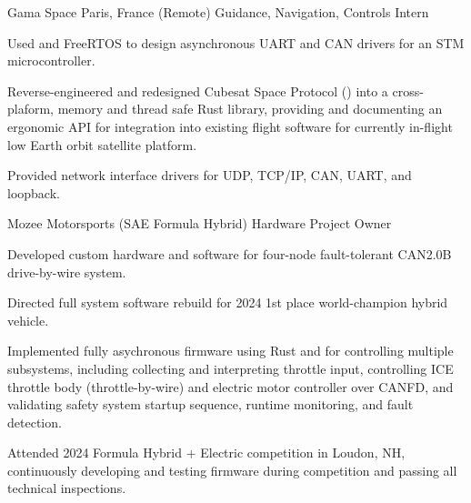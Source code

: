 \documentclass[11pt]{article}
\begin{document}
\sectionloc
{Gama Space} {Paris, France (Remote)}
{Guidance, Navigation, Controls Intern} {}
{\begin{circlist}
  \item Used  and FreeRTOS to design asynchronous UART and CAN drivers for an STM microcontroller.
  \item Reverse-engineered and redesigned Cubesat Space Protocol () into a cross-plaform, memory and thread safe Rust library, 
        providing and documenting an ergonomic API for integration into existing flight software for currently in-flight low Earth orbit satellite platform.
  \item Provided network interface drivers for UDP, TCP/IP, CAN, UART, and loopback. 
\end{circlist}}



\sectiondate
{Mozee Motorsports (SAE Formula Hybrid)}
{Hardware Project Owner} {}  

{\vspace{-1.4ex}}
\begin{circlist}
  \item Developed custom hardware and software for four-node fault-tolerant CAN2.0B drive-by-wire system.
\end{circlist}
{\vspace{-1.4ex}}
\begin{circlist}
  \item Directed full system software rebuild for 2024 1st place world-champion hybrid vehicle.
  \item Implemented fully asychronous firmware using Rust and  for controlling multiple subsystems, including collecting and interpreting throttle input, controlling ICE throttle body (throttle-by-wire) and electric motor controller over CANFD, and validating safety system startup sequence, runtime monitoring, and fault detection.
  \item Attended 2024 Formula Hybrid + Electric competition in Loudon, NH, continuously developing and testing firmware during competition and passing all technical inspections.
\end{circlist}
\end{document}
